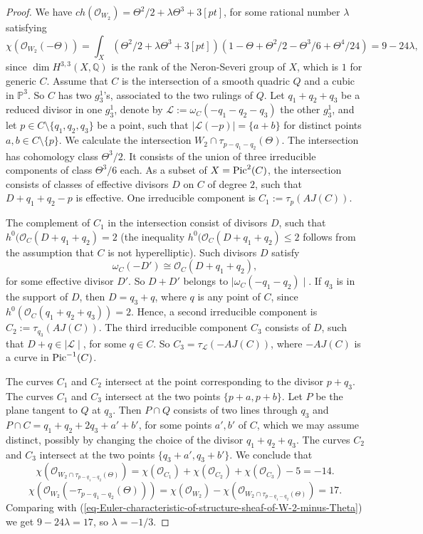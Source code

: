 \documentclass[12pt]{amsart}
\numberwithin{equation}{subsection}
\theoremstyle{plain}
\theoremstyle{definition}
\newcommand{\LB}{{\mathcal L}}
\newcommand{\QQ}{{\mathbb Q}}
\newcommand{\PP}{{\mathbb P}}
\newcommand{\linsys}[1]{{\mid}#1{\mid}}
\newcommand{\StructureSheaf}[1]{{\mathcal O}_{#1}}
\newcommand{\Pic}{{\rm Pic}}
\begin{document}
\begin{proof}
We have $ch(\StructureSheaf{W_2})=\Theta^2/2 +\lambda\Theta^3+3[pt]$, for some rational number $\lambda$ satisfying
\begin{equation}
\label{eq-Euler-characteristic-of-structure-sheaf-of-W-2-minus-Theta}
\chi(\StructureSheaf{W_2}(-\Theta))=\int_X\left(\Theta^2/2 +\lambda\Theta^3+3[pt]\right)
\left(1-\Theta+\Theta^2/2-\Theta^3/6+\Theta^4/24\right)=9-24\lambda,
\end{equation}
since $\dim H^{3,3}(X,\QQ)$ is the rank of the Neron-Severi group of $X$, which is $1$ for generic $C$.
Assume that $C$ is the intersection of a smooth quadric $Q$ and a cubic in $\PP^3$. So $C$ has two $g^1_3$'s, associated to the two rulings of $Q$.
Let $q_1+q_2+q_3$ be a reduced divisor in one $g^1_3$, denote by $\LB:=\omega_C(-q_1-q_2-q_3)$ the other $g^1_3$, and let $p\in C\setminus\{q_1,q_2,q_3\}$ be a point, such that $\linsys{\LB(-p)}=\{a+b\}$ for distinct points $a, b \in C\setminus\{p\}$. 
We calculate the intersection $W_2\cap \tau_{p-q_1-q_2}(\Theta)$. 
The intersection has cohomology class $\Theta^3/2$. It consists of the union of three irreducible components of class $\Theta^3/6$ each.
As a subset of $X=\Pic^2(C)$, the intersection consists of classes of effective divisors $D$ on $C$ of degree $2$, such that $D+q_1+q_2-p$ is effective. 
One irreducible component is $C_1:=\tau_p(AJ(C))$.

The complement of $C_1$ in the intersection consist of divisors $D$, such that $h^0(\StructureSheaf{C}(D+q_1+q_2)=2$ (the inequality $h^0(\StructureSheaf{C}(D+q_1+q_2)\leq2$ follows from the assumption that $C$ is not hyperelliptic). Such divisors $D$ satisfy 
\[
\omega_C(-D')\cong \StructureSheaf{C}(D+q_1+q_2),
\]
for some effective divisor $D'$. So $D+D'$ belongs to $\linsys{\omega_C(-q_1-q_2)}$. 
If $q_3$ is in the support of $D$, then $D=q_3+q$, where $q$ is any point of $C$, since $h^0(\StructureSheaf{C}(q_1+q_2+q_3))=2$.
Hence, a second irreducible component is $C_2:=\tau_{q_3}(AJ(C))$.
The third irreducible component $C_3$ consists of $D$, such that $D+q\in \linsys{\LB}$, for some $q\in C$. So $C_3=\tau_{\LB}(-AJ(C))$,
where $-AJ(C)$ is a curve in $\Pic^{-1}(C)$. 

The curves $C_1$ and $C_2$ intersect at the point corresponding to the divisor $p+q_3$. The curves $C_1$ and $C_3$ intersect at the two points
$\{p+a, p+b\}$. 
Let $P$ be the plane tangent to $Q$ at $q_3$. Then $P\cap Q$ consists of two lines through $q_3$ and $P\cap C=q_1+q_2+2q_3+a'+b'$, for some points $a', b'$ of $C$, which we may assume distinct, possibly by changing the choice of the divisor $q_1+q_2+q_3$. 
The curves $C_2$ and $C_3$ intersect at the two points $\{q_3+a', q_3+b'\}$.
We conclude that
\[
\chi(\StructureSheaf{W_2\cap \tau_{p-q_1-q_2}(\Theta)})=\chi(\StructureSheaf{C_1})+\chi(\StructureSheaf{C_2})+\chi(\StructureSheaf{C_3})-5=-14.
\]
\[
\chi(\StructureSheaf{W_2}(-\tau_{p-q_1-q_2}(\Theta)))=\chi(\StructureSheaf{W_2})-\chi(\StructureSheaf{W_2\cap \tau_{p-q_1-q_2}(\Theta)})=17.
\]
Comparing with (\ref{eq-Euler-characteristic-of-structure-sheaf-of-W-2-minus-Theta}) we get $9-24\lambda=17$, so $\lambda=-1/3$.
\end{proof}
\end{document}
